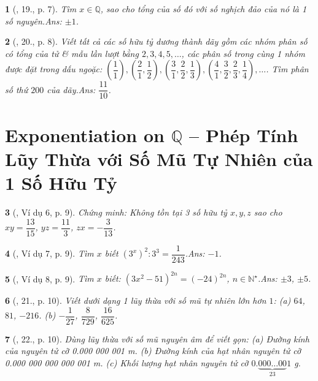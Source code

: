 \documentclass{article}
\newtheorem{baitoan}{}
\begin{document}
\begin{baitoan}[\cite{Binh_Toan_7_tap_1}, 19., p. 7]
	Tìm $x\in\mathbb{Q}$, sao cho tổng của số đó với số nghịch đảo của nó là 1 số nguyên.\hfill{\sf Ans: $\pm 1$.}
\end{baitoan}

\begin{baitoan}[\cite{Binh_Toan_7_tap_1}, 20., p. 8]
	Viết tất cả các số hữu tỷ dương  thành dãy gồm các nhóm phân số có tổng của tử \& mẫu lần lượt bằng $2,3,4,5,\ldots$, các phân số trong cùng 1 nhóm được đặt trong dấu ngoặc: $\left(\dfrac{1}{1}\right),\left(\dfrac{2}{1},\dfrac{1}{2}\right),\left(\dfrac{3}{1},\dfrac{2}{2},\dfrac{1}{3}\right),\left(\dfrac{4}{1},\dfrac{3}{2},\dfrac{2}{3},\dfrac{1}{4}\right),\ldots$. Tìm phân số thứ $200$ của dãy.\hfill{\sf Ans: $\dfrac{11}{10}$.}
\end{baitoan}


\section{Exponentiation on $\mathbb{Q}$ -- Phép Tính Lũy Thừa với Số Mũ Tự Nhiên của 1 Số Hữu Tỷ}

\begin{baitoan}[\cite{Tuyen_Toan_7}, Ví dụ 6, p. 9]
	Chứng minh: Không tồn tại 3 số hữu tỷ $x,y,z$ sao cho $xy = \dfrac{13}{15}$, $yz = \dfrac{11}{3}$, $zx = -\dfrac{3}{13}$.
\end{baitoan}

\begin{baitoan}[\cite{Tuyen_Toan_7}, Ví dụ 7, p. 9]
	Tìm $x$ biết $(3^x)^2:3^3 = \dfrac{1}{243}$.\hfill{\sf Ans: $-1$.}
\end{baitoan}

\begin{baitoan}[\cite{Tuyen_Toan_7}, Ví dụ 8, p. 9]
	Tìm $x$ biết: $(3x^2 - 51)^{2n} = (-24)^{2n}$, $n\in\mathbb{N}^\star$.\hfill{\sf Ans: $\pm3$, $\pm5$.}
\end{baitoan}

\begin{baitoan}[\cite{Tuyen_Toan_7}, 21., p. 10]
	Viết dưới dạng 1 lũy thừa với số mũ tự nhiên lớn hơn $1$: (a) $64$, $81$, $-216$. (b) $-\dfrac{1}{27}$, $\dfrac{8}{729}$, $\dfrac{16}{625}$.
\end{baitoan}

\begin{baitoan}[\cite{Tuyen_Toan_7}, 22., p. 10]
	Dùng lũy thừa với số mũ nguyên âm để viết gọn: (a) Đường kính của nguyên tử cỡ {\rm0.000 000 001 m}. (b) Đường kính của hạt nhân nguyên tử cỡ {\rm0.000 000 000 000 001 m}. (c) Khối lượng hạt nhân nguyên tử cỡ $0.\underbrace{000\ldots 00}_{23}1$ {\rm g}.
\end{baitoan}
\end{document}
